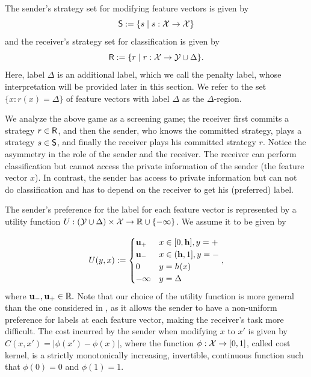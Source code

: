 The sender's strategy set for modifying feature vectors is given by
\begin{equation}\label{eqn:Sender's strategy space}
	\mathsf{S} := \{s \;|\; s: \mathcal{X} \rightarrow \mathcal{X} \}
\end{equation}
and the receiver's strategy set for classification is given by
\begin{equation}\label{eqn:Receiver's strategy space}
	\mathsf{R} := \{r\;|\; r:\mathcal{X} \rightarrow \mathcal{Y} \cup \Delta\}.
\end{equation}
Here, label $\Delta$ is an additional label, which we call the penalty label, whose interpretation will be provided later in this section. We refer to the set $\{x: r(x) = \Delta\}$ of feature vectors with label $\Delta$ as the $\Delta$-region.

We analyze the above game as a screening game;
the receiver first commits a strategy $r \in \mathsf{R}$, and then the sender, who knows the committed strategy, plays a strategy $s \in \mathsf{S}$, and finally the receiver plays his committed strategy $r$. Notice the asymmetry in the role of the sender and the receiver. The receiver can perform classification but cannot access the private information of the sender (the feature vector $x$). In contrast, the sender has access to private information but can not do classification and has to depend on the receiver to get his (preferred) label.

The sender's preference for the label for each feature vector is represented by a utility function $U: (\mathcal{Y} \cup \Delta) \times \mathcal{X} \rightarrow \mathbb{R} \cup \{-\infty\}$. We assume it to be  given by

\begin{equation}\label{eqn:Utility}
	U(y,x) := \begin{cases}
		\mathbf{u_+} & x \in [0,\mathbf{h}], y = \mathbf{+} \\
		\mathbf{u_-} & x \in (\mathbf{h},1], y = \mathbf{-} \\
		0 & y = h(x)\\
		-\infty & y = \Delta
	\end{cases},
\end{equation}
where $\mathbf{u_-},\mathbf{u_+} \in \mathbb{R}.$
Note that our choice of the utility function is more general than the one considered in \cite{hardt2016strategic}, as it allows the sender to have a non-uniform preference for labels at each feature vector, making the receiver's task more difficult. The cost incurred by the sender when modifying $x$ to $x'$ is given by $C(x,x') = |\phi(x') - \phi(x)|$, where the function $\phi: \mathcal{X} \rightarrow [0,1]$, called cost kernel, is a strictly monotonically increasing, invertible,   continuous function such that $\phi(0) = 0$ and $\phi(1)  = 1$.

